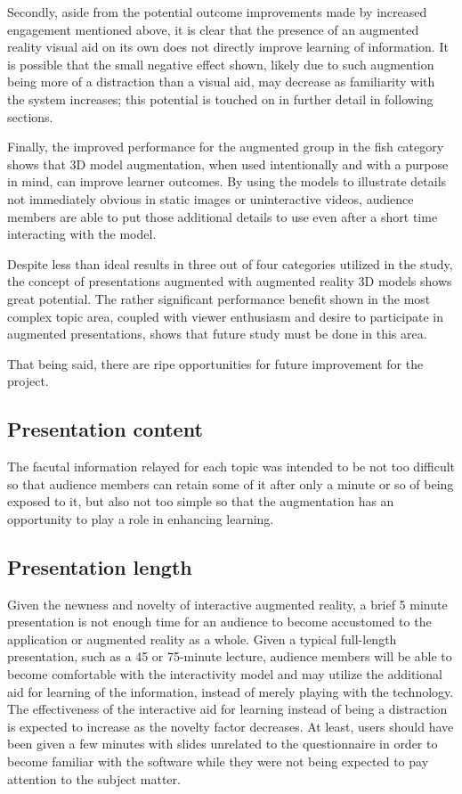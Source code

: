 \documentclass[10pt,journal]{IEEEtran}
\begin{document}
Secondly, aside from the potential outcome improvements made by increased
engagement mentioned above, it is clear that the presence of an augmented
reality visual aid on its own does not directly improve learning of
information. It is possible that the small negative effect shown, likely due to
such augmention being more of a distraction than a visual aid, may decrease as
familiarity with the system increases; this potential is touched on in further
detail in following sections.

Finally, the improved performance for the augmented group in the fish category
shows that 3D model augmentation, when used intentionally and with a purpose in
mind, can improve learner outcomes. By using the models to illustrate details
not immediately obvious in static images or uninteractive videos, audience
members are able to put those additional details to use even after a short time
interacting with the model.

Despite less than ideal results in three out of four categories utilized in the
study, the concept of presentations augmented with augmented reality 3D models
shows great potential. The rather significant performance benefit shown in the
most complex topic area, coupled with viewer enthusiasm and desire to
participate in augmented presentations, shows that future study must be done in
this area.

That being said, there are ripe opportunities for future improvement for the
project.

\subsection{Presentation content}

The facutal information relayed for each topic was intended to be not too
difficult so that audience members can retain some of it after only a minute or
so of being exposed to it, but also not too simple so that the augmentation has
an opportunity to play a role in enhancing learning.

\subsection{Presentation length}

Given the newness and novelty of interactive augmented reality, a brief 5
minute presentation is not enough time for an audience to become accustomed to
the application or augmented reality as a whole. Given a typical full-length
presentation, such as a 45 or 75-minute lecture, audience members will be able
to become comfortable with the interactivity model and may utilize the
additional aid for learning of the information, instead of merely playing with
the technology. The effectiveness of the interactive aid for learning instead
of being a distraction is expected to increase as the novelty factor decreases.
At least, users should have been given a few minutes with slides unrelated
to the questionnaire in order to become familiar with the software while they
were not being expected to pay attention to the subject matter.
\end{document}
